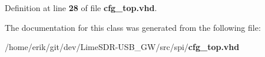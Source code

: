 Definition at line {\bf 28} of file {\bf cfg\+\_\+top.\+vhd}.



The documentation for this class was generated from the following file\+:\begin{DoxyCompactItemize}
\item 
/home/erik/git/dev/\+Lime\+S\+D\+R-\/\+U\+S\+B\+\_\+\+G\+W/src/spi/{\bf cfg\+\_\+top.\+vhd}\end{DoxyCompactItemize}

